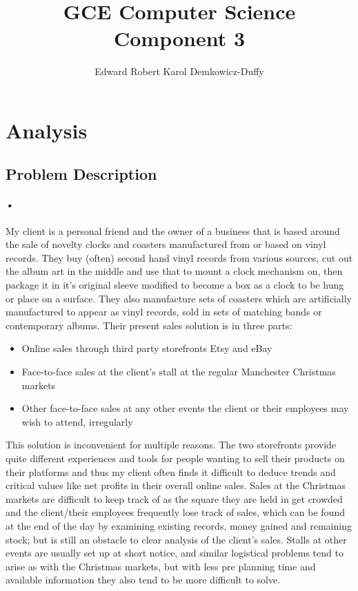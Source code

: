 \documentclass{article}
\title{GCE Computer Science Component 3}
\author{Edward Robert Karol Demkowicz-Duffy}
\begin{document}
    \maketitle
    \newpage
    \tableofcontents
    \newpage
    
    
    \section{Analysis}
    \subsection{Problem Description}
    \paragraph{•}
    My client is a personal friend and the owner of a business that is based around the sale of novelty clocks and coasters manufactured from or based on vinyl records. 
    They buy (often) second hand vinyl records from various sources, cut out the album art in the middle and use that to mount a clock mechanism on, then package it in it’s original sleeve modified to become a box as a clock to be hung or place on a surface. 
    They also manufacture sets of coasters which are artificially manufactured to appear as vinyl records, sold in sets of matching bands or contemporary albums. 
    Their present sales solution is in three parts:
    \begin{itemize}
    \item Online sales through third party storefronts Etsy and eBay
    \item Face-to-face sales at the client’s stall at the regular Manchester Christmas markets
    \item Other face-to-face sales at any other events the client or their employees may wish to attend, irregularly
    \end{itemize}
    This solution is inconvenient for multiple reasons. 
    The two storefronts provide quite different experiences and tools for people wanting to sell their products on their platforms and thus my client often finds it difficult to deduce trends and critical values like net profits in their overall online sales. 
    Sales at the Christmas markets are difficult to keep track of as the square they are held in get crowded and the client/their employees frequently lose track of sales, which can be found at the end of the day by examining existing records, money gained and remaining stock; but is still an obstacle to clear analysis of the client’s sales. 
    Stalls at other events are usually set up at short notice, and similar logistical problems tend to arise as with the Christmas markets, but with less pre planning time and available information they also tend to be more difficult to solve. 
\end{document}

